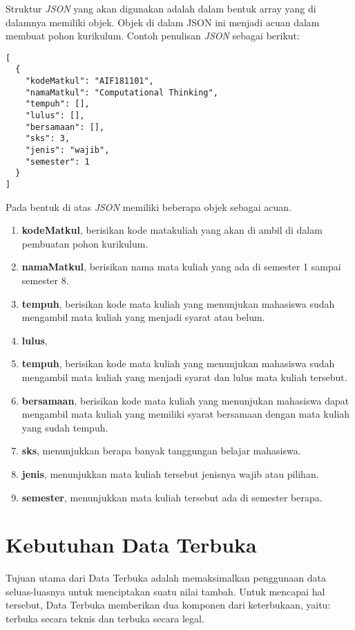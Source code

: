 Struktur \textit{JSON} yang akan digunakan adalah dalam bentuk array yang di dalamnya memiliki objek.  
Objek di dalam JSON ini menjadi acuan dalam membuat pohon kurikulum. Contoh penulisan \textit{JSON} sebagai berikut:

\begin{lstlisting}
[
  {
    "kodeMatkul": "AIF181101",
    "namaMatkul": "Computational Thinking",
    "tempuh": [],
    "lulus": [],
    "bersamaan": [],
    "sks": 3,
    "jenis": "wajib",
    "semester": 1
  }
]
\end{lstlisting}

Pada bentuk di atas \textit{JSON} memiliki beberapa objek sebagai acuan.
\begin{enumerate}
\item \textbf{kodeMatkul}, berisikan kode matakuliah yang akan di ambil di dalam pembuatan pohon kurikulum.
\item \textbf{namaMatkul}, berisikan nama mata kuliah yang ada di semester 1 sampai semester 8.
\item \textbf{tempuh}, berisikan kode mata kuliah yang menunjukan mahasiswa sudah mengambil mata kuliah yang menjadi syarat atau belum. 
\item \textbf{lulus}, \item \textbf{tempuh}, berisikan kode mata kuliah yang menunjukan mahasiswa sudah mengambil mata kuliah yang menjadi syarat dan lulus mata kuliah tersebut.
\item \textbf{bersamaan}, berisikan kode mata kuliah yang menunjukan mahasiswa dapat mengambil mata kuliah yang memiliki syarat bersamaan dengan mata kuliah yang sudah tempuh.
\item \textbf{sks}, menunjukkan berapa banyak tanggungan belajar mahasiswa.
\item \textbf{jenis}, menunjukkan mata kuliah tersebut jenisnya wajib atau pilihan.
\item \textbf{semester}, menunjukkan mata kuliah tersebut ada di semester berapa.
\end{enumerate}

\section{Kebutuhan Data Terbuka}
\label{sec: Kebutuhan Data Terbuka}
Tujuan utama dari Data Terbuka adalah memaksimalkan penggunaan data seluas-luasnya untuk menciptakan suatu nilai tambah. Untuk mencapai hal tersebut, Data Terbuka memberikan dua komponen dari keterbukaan, yaitu: terbuka secara teknis dan terbuka secara legal. 



